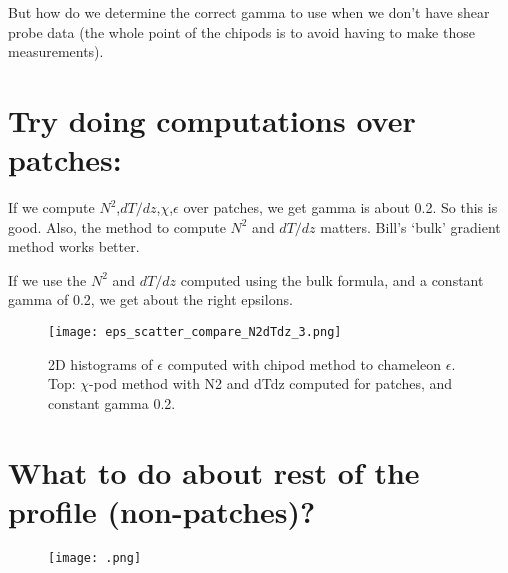 \documentclass[11pt]{article}
\begin{document}
But how do we determine the correct gamma to use when we don't have shear probe data (the whole point of the chipods is to avoid having to make those measurements).


\section{Try doing computations over patches:}

If we compute $N^2$,$dT/dz$,$\chi$,$\epsilon$ over patches, we get gamma is about 0.2. So this is good. Also, the method to compute $N^2$ and $dT/dz$ matters. Bill's `bulk' gradient method works better.

If we use the $N^2$ and $dT/dz$ computed using the bulk formula, and a constant gamma of 0.2, we get about the right epsilons.

\begin{figure}[htbp]
\texttt{[image: eps\_scatter\_compare\_N2dTdz\_3.png]}
\caption{2D histograms of $\epsilon$ computed with chipod method to chameleon $\epsilon$. Top: $\chi$-pod method with N2 and dTdz computed for patches, and constant gamma 0.2. }
\label{}
\end{figure}


\section{What to do about rest of the profile (non-patches)?}



\begin{figure}[htbp]
\texttt{[image: .png]}
\caption{}
\label{}
\end{figure}






\end{document}

